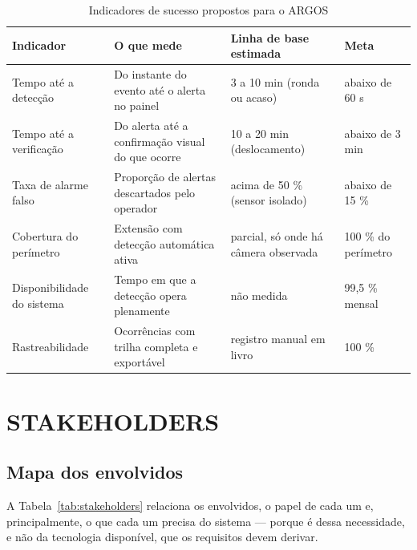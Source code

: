 \documentclass[12pt,a4paper,oneside]{article}
\newcommand{\fonte}[1]{\par\vspace{5pt}{\footnotesize\singlespacing Fonte: #1\par}}
\newcommand{\cab}[1]{\textbf{\footnotesize #1}}
\begin{document}
\begin{table}[H]
\centering
\caption{Indicadores de sucesso propostos para o ARGOS}
\label{tab:indicadores}
{\small\singlespacing
\begin{tabularx}{\textwidth}{L{4.4cm} X L{2.6cm} L{2.0cm}}
\toprule
\cab{Indicador} & \cab{O que mede} & \cab{Linha de base estimada} & \cab{Meta} \\
\midrule
Tempo até a detecção & Do instante do evento até o alerta no painel & 3 a 10
min (ronda ou acaso) & abaixo de 60 s \\
Tempo até a verificação & Do alerta até a confirmação visual do que ocorre &
10 a 20 min (deslocamento) & abaixo de 3 min \\
Taxa de alarme falso & Proporção de alertas descartados pelo operador & acima
de 50 \% (sensor isolado) & abaixo de 15 \% \\
Cobertura do perímetro & Extensão com detecção automática ativa & parcial, só
onde há câmera observada & 100 \% do perímetro \\
Disponibilidade do sistema & Tempo em que a detecção opera plenamente & não
medida & 99,5 \% mensal \\
Rastreabilidade & Ocorrências com trilha completa e exportável & registro
manual em livro & 100 \% \\
\bottomrule
\end{tabularx}}
\fonte{elaborado pelos autores (2026). Linha de base estimada pela equipe, a
ser substituída por medição.}
\end{table}

\section{STAKEHOLDERS}
\label{sec:stakeholders}

\subsection{Mapa dos envolvidos}

A Tabela~\ref{tab:stakeholders} relaciona os envolvidos, o papel de cada um e,
principalmente, o que cada um precisa do sistema — porque é dessa necessidade,
e não da tecnologia disponível, que os requisitos devem derivar.
\end{document}
